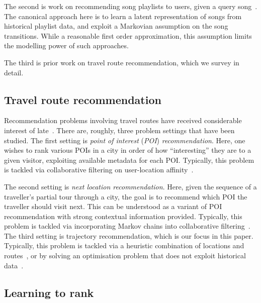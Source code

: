 The second is work on recommending song playlists to users, given a query song~\citep{McFee:2011,chen2012playlist}.
The canonical approach here is to
learn a latent representation of songs from historical playlist data,
and exploit a Markovian assumption on the song transitions.
While a reasonable first order approximation, this assumption limits the modelling power of such approaches.

The third is prior work on travel route recommendation, which we survey in detail.


\secmoveup
\subsection{Travel route recommendation}
\textmoveup

Recommendation problems involving travel routes have received considerable interest of late~\cite{bao2015recommendations,zheng2015trajectory,zheng2014urban}.
There are, roughly, three problem settings that have been studied.
The first setting is \emph{point of interest} (\emph{POI}) \emph{recommendation}.
Here, one wishes to rank various POIs in a city in order of how ``interesting'' they are to a given visitor,
exploiting
available metadata for each POI.
Typically, this problem is tackled via
collaborative filtering on user-location affinity~\cite{shi2011personalized,lian2014geomf,hsieh2014mining,yuan2014graph}.

The second setting is \emph{next location recommendation}.
Here, given the sequence of a traveller's partial tour through a city,
the goal is to recommend which POI the traveller should visit next.
This can be understood as a variant of POI recommendation with strong contextual information provided.
Typically, this problem is tackled via
incorporating Markov chains into collaborative filtering~\cite{fpmc10,ijcai13,zhang2015location}.
The third setting is trajectory recommendation,
which is our focus in this paper.
Typically, this problem is tackled via
a heuristic combination of locations and routes~\cite{lu2010photo2trip,ijcai15,lu2012personalized}, or
by solving an optimisation problem that does not exploit historical data~\cite{gioniswsdm14,chen2015tripplanner}.


\secmoveup
\subsection{Learning to rank}
\textmoveup

